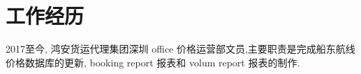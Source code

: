 \chapter{工作经历}
2017至今, 鸿安货运代理集团深圳 office 价格运营部文员,主要职责是完成船东航线价格数据库的更新, booking report 报表和 volum report 报表的制作. 
